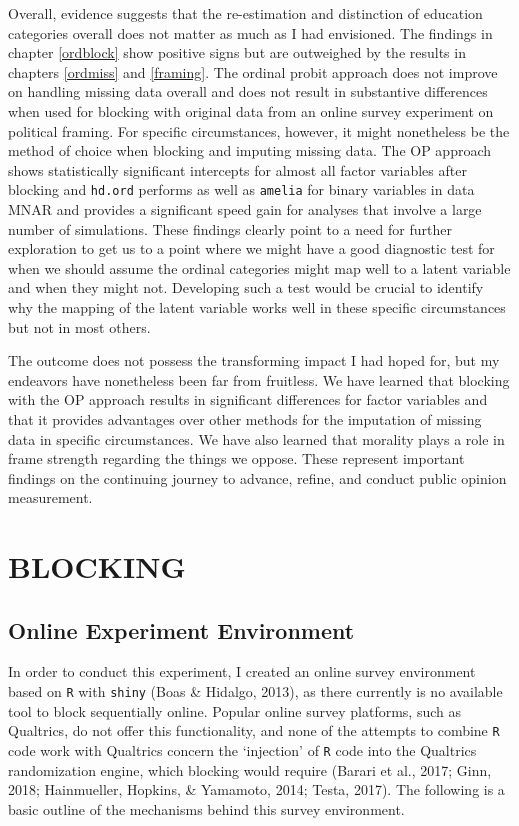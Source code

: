 \documentclass[12pt,econ]{sources/authesis}
\begin{document}
Overall, evidence suggests that the re-estimation and distinction of education categories overall does not matter as much as I had envisioned. The findings in chapter \ref{ordblock} show positive signs but are outweighed by the results in chapters \ref{ordmiss} and \ref{framing}. The ordinal probit approach does not improve on handling missing data overall and does not result in substantive differences when used for blocking with original data from an online survey experiment on political framing. For specific circumstances, however, it might nonetheless be the method of choice when blocking and imputing missing data. The OP approach shows statistically significant intercepts for almost all factor variables after blocking and \texttt{hd.ord} performs as well as \texttt{amelia} for binary variables in data MNAR and provides a significant speed gain for analyses that involve a large number of simulations. These findings clearly point to a need for further exploration to get us to a point where we might have a good diagnostic test for when we should assume the ordinal categories might map well to a latent variable and when they might not. Developing such a test would be crucial to identify why the mapping of the latent variable works well in these specific circumstances but not in most others.

The outcome does not possess the transforming impact I had hoped for, but my endeavors have nonetheless been far from fruitless. We have learned that blocking with the OP approach results in significant differences for factor variables and that it provides advantages over other methods for the imputation of missing data in specific circumstances. We have also learned that morality plays a role in frame strength regarding the things we oppose. These represent important findings on the continuing journey to advance, refine, and conduct public opinion measurement.

\appendix

\hypertarget{app-ordblock}{%
\chapter{BLOCKING}\label{app-ordblock}}

\hypertarget{app-ordblock-env}{%
\section{Online Experiment Environment}\label{app-ordblock-env}}

In order to conduct this experiment, I created an online survey environment based on \texttt{R} with \texttt{shiny} (Boas \& Hidalgo, 2013), as there currently is no available tool to block sequentially online. Popular online survey platforms, such as Qualtrics, do not offer this functionality, and none of the attempts to combine \texttt{R} code work with Qualtrics concern the `injection' of \texttt{R} code into the Qualtrics randomization engine, which blocking would require (Barari et al., 2017; Ginn, 2018; Hainmueller, Hopkins, \& Yamamoto, 2014; Testa, 2017). The following is a basic outline of the mechanisms behind this survey environment.
\end{document}
